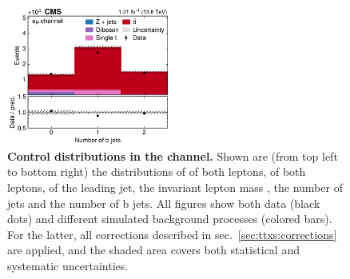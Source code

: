 \begin{figure}[!p]
\hfill
\includegraphics[width=0.49\textwidth]{figures/ttxs/nbtag_em.pdf}
\caption{
    \textbf{Control distributions in the \emu channel.} Shown are (from top left to bottom right) the distributions of \pt of both leptons, \abseta of both leptons, \pt of the leading jet, the invariant lepton mass \mll, the number of jets and the number of b jets. All figures show both data (black dots) and different simulated background processes (colored bars). For the latter, all corrections described in sec.~\ref{sec:ttxs:corrections} are applied, and the shaded area covers both statistical and systematic uncertainties. 
}
\label{fig:ttxs:control_em}
\end{figure}


